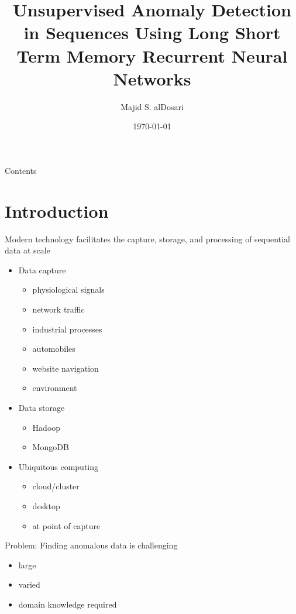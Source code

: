 \documentclass{beamer}
\title{Unsupervised Anomaly Detection in Sequences
Using Long Short Term Memory Recurrent Neural Networks}
\date{\today} %
\author{Majid S. alDosari}
\institute{George Mason University}
\begin{document}
  \maketitle

  \begin{frame}{Contents}
    \tableofcontents 
  \end{frame}

  \section{Introduction}

  \begin{frame}{Modern technology facilitates the 
      capture, storage, and processing of sequential data at scale}

    \begin{itemize}
    \item Data capture
      \begin{itemize}
      \item physiological signals
      \item network traffic
      \item industrial processes
      \item automobiles
      \item website navigation
      \item environment
      \end{itemize}
    \item Data storage
      \begin{itemize}
      \item Hadoop
      \item MongoDB
      \end{itemize}
    \item Ubiquitous computing
      \begin{itemize}
      \item cloud/cluster
      \item desktop
      \item at point of capture
      \end{itemize}
    \end{itemize}    

  \end{frame}


  \begin{frame}{Problem: Finding anomalous data is challenging}

    \begin{itemize}
    \item large 
    \item varied
    \item domain knowledge required
    \end{itemize}

  \end{frame}
\end{document}
